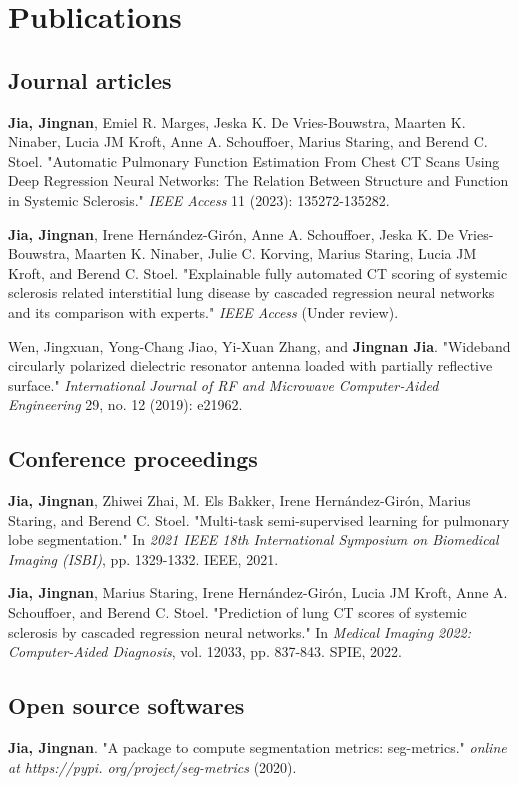 \chapter{Publications}

\section*{Journal articles}

\noindent
\textbf{Jia, Jingnan}, Emiel R. Marges, Jeska K. De Vries-Bouwstra, Maarten K. Ninaber, Lucia JM Kroft, Anne A. Schouffoer, Marius Staring, and Berend C. Stoel. "Automatic Pulmonary Function Estimation From Chest CT Scans Using Deep Regression Neural Networks: The Relation Between Structure and Function in Systemic Sclerosis." \textit{IEEE Access} 11 (2023): 135272-135282. 
\bigskip

\noindent
\textbf{Jia, Jingnan}, Irene Hernández-Girón, Anne A. Schouffoer, Jeska K. De Vries-Bouwstra, Maarten K. Ninaber, Julie C. Korving, Marius Staring,  Lucia JM Kroft,  and Berend C. Stoel. "Explainable fully automated CT scoring of systemic sclerosis related interstitial lung disease by cascaded regression neural networks and its comparison with experts." \textit{IEEE Access} (Under review). 
\bigskip

\noindent
Wen, Jingxuan, Yong‐Chang Jiao, Yi‐Xuan Zhang, and \textbf{Jingnan Jia}. "Wideband circularly polarized dielectric resonator antenna loaded with partially reflective surface." \textit{International Journal of RF and Microwave Computer‐Aided Engineering} 29, no. 12 (2019): e21962. 
\bigskip

\section*{Conference proceedings}

\noindent
\textbf{Jia, Jingnan}, Zhiwei Zhai, M. Els Bakker, Irene Hernández-Girón, Marius Staring, and Berend C. Stoel. "Multi-task semi-supervised learning for pulmonary lobe segmentation." In \textit{2021 IEEE 18th International Symposium on Biomedical Imaging (ISBI)}, pp. 1329-1332. IEEE, 2021. 

\bigskip
\noindent
\textbf{Jia, Jingnan}, Marius Staring, Irene Hernández-Girón, Lucia JM Kroft, Anne A. Schouffoer, and Berend C. Stoel. "Prediction of lung CT scores of systemic sclerosis by cascaded regression neural networks." In \textit{Medical Imaging 2022: Computer-Aided Diagnosis}, vol. 12033, pp. 837-843. SPIE, 2022. 

\bigskip

\section*{Open source softwares}

\noindent
\textbf{Jia, Jingnan}. "A package to compute segmentation metrics: seg-metrics." \textit{online at https://pypi. org/project/seg-metrics} (2020). 